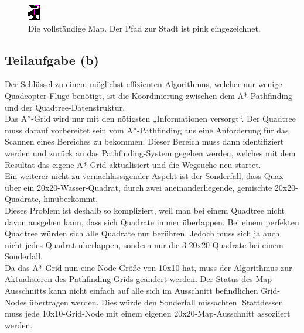 \documentclass[a4paper,12pt]{article}
\begin{document}
\begin{figure}[H]
\centering
    \includegraphics[width=.5\linewidth]{Bilder/Aufgabe3/Beispiel_04.png}
    \caption{Die vollständige Map. Der Pfad zur Stadt ist pink eingezeichnet.}
\end{figure}

\subsection{Teilaufgabe (b)}
Der Schlüssel zu einem möglichst effizienten Algorithmus, welcher nur wenige Quadcopter-Flüge benötigt, ist die Koordinierung zwischen dem A*-Pathfinding und der Quadtree-Datenstruktur.
\\[0.4cm]
Das A*-Grid wird nur mit den nötigsten „Informationen versorgt“.
Der Quadtree muss darauf vorbereitet sein vom A*-Pathfinding aus eine Anforderung für das Scannen eines Bereiches zu bekommen. Dieser Bereich muss dann identifiziert werden und zurück an das Pathfinding-System gegeben werden, welches mit dem Resultat das eigene A*-Grid aktualisiert und die Wegsuche neu startet.
\\[0.4cm]
Ein weiterer nicht zu vernachlässigender Aspekt ist der Sonderfall, dass Quax über ein 20x20-Wasser-Quadrat, durch zwei aneinanderliegende, gemischte 20x20-Quadrate, hinüberkommt.
\\[0.4cm]
Dieses Problem ist deshalb so kompliziert, weil man bei einem Quadtree nicht davon ausgehen kann, dass sich Quadrate immer überlappen. Bei einem perfekten Quadtree würden sich alle Quadrate nur berühren. Jedoch muss sich ja auch nicht jedes Quadrat überlappen, sondern nur die 3 20x20-Quadrate bei einem Sonderfall.
\\[0.4cm]
Da das A*-Grid nun eine Node-Größe von 10x10 hat, muss der Algorithmus zur Aktualisieren des Pathfinding-Grids geändert werden. Der Status des Map-Ausschnitts kann nicht einfach auf alle sich im Ausschnitt befindlichen Grid-Nodes übertragen werden. Dies würde den Sonderfall missachten. Stattdessen muss jede 10x10-Grid-Node mit einem eigenen 20x20-Map-Ausschnitt assoziiert werden. 
\end{document}

